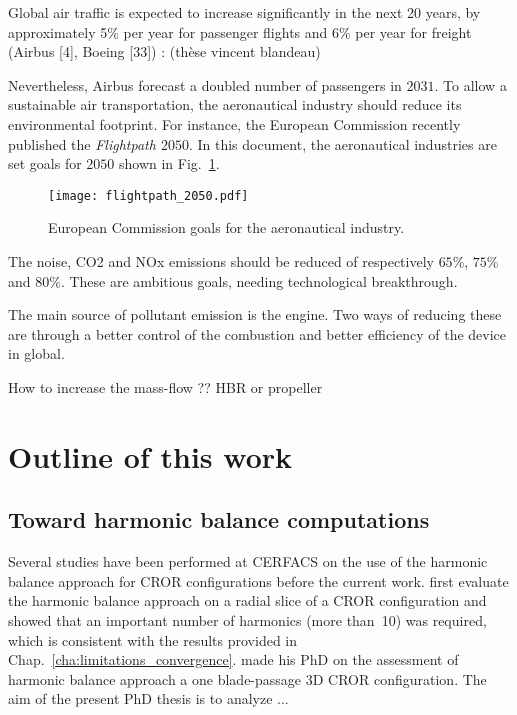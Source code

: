Global air traffic is expected to increase significantly in the next 20 years, 
by approximately 5\% per year for passenger flights and 6\% 
per year for freight (Airbus [4], Boeing [33]) : (thèse vincent blandeau)


Nevertheless, Airbus forecast a doubled number of passengers in
$2031$. To allow a sustainable air transportation, the aeronautical
industry should reduce its environmental footprint. For instance,
the European Commission recently published the \emph{Flightpath $2050$}.
In this document, the aeronautical industries are set goals for $2050$
shown in Fig.~\ref{fig:flightpath_2050}.
\begin{figure}[htp]
  \centering
  \texttt{[image: flightpath\_2050.pdf]}
  \caption{European Commission goals for the aeronautical industry. }
  \label{fig:flightpath_2050}
\end{figure}
The noise, CO2 and NOx emissions should be reduced of 
respectively $65\%$, $75\%$ and $80\%$.
These are ambitious goals, needing technological breakthrough.

The main source of pollutant emission is the engine. Two ways of reducing
these are through a better control of the combustion and better
efficiency of the device in global.

How to increase the mass-flow ??
HBR or propeller




\section*{Outline of this work}
\label{sec:outline_of_this_work}

\subsection*{Toward harmonic balance computations}
\label{sub:toward_harmonic_balance_computations}

Several studies have been performed at CERFACS on the use
of the harmonic balance approach for CROR configurations 
before the current work.
\citet{Yabili2010} first evaluate the harmonic balance approach
on a radial slice of a CROR configuration and showed that an
important number of harmonics (more than~10) was required,
which is consistent with the results provided in 
Chap.~\ref{cha:limitations_convergence}.
\citet{ThesisFrancois} made his PhD on the assessment of
harmonic balance approach a one blade-passage 3D CROR configuration.
The aim of the present PhD thesis is to analyze ...



